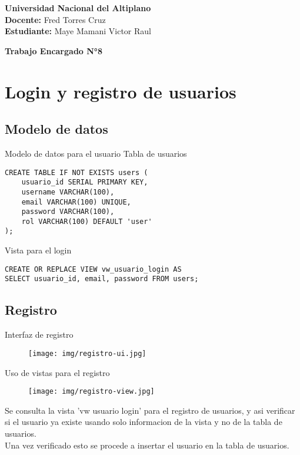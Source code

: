 \documentclass[12pt]{article}
\begin{document}
\noindent \textbf{Universidad Nacional del Altiplano\\
Docente: } Fred Torres Cruz\\
\textbf{Estudiante:} Maye Mamani Victor Raul

\vspace{2mm}
\noindent\textbf{Trabajo Encargado N°8}\\


\section{Login y registro de usuarios}
\subsection{Modelo de datos}
\large{Modelo de datos para el usuario}
\large{Tabla de usuarios}
\begin{verbatim}
CREATE TABLE IF NOT EXISTS users (
    usuario_id SERIAL PRIMARY KEY,
    username VARCHAR(100),
    email VARCHAR(100) UNIQUE,
    password VARCHAR(100),
    rol VARCHAR(100) DEFAULT 'user'
);
\end{verbatim}

\large{Vista para el login}
\begin{verbatim}
CREATE OR REPLACE VIEW vw_usuario_login AS
SELECT usuario_id, email, password FROM users;
\end{verbatim}


\subsection{Registro}
\large{Interfaz de registro}
\begin{figure}[H]
    \centering
    \texttt{[image: img/registro-ui.jpg]}
\end{figure}
\large{Uso de vistas para el registro}
\begin{figure}[H]
    \centering
    \texttt{[image: img/registro-view.jpg]}
\end{figure}
Se consulta la vista 'vw usuario login' para el registro de usuarios, y asi verificar si el usuario ya existe usando solo informacion de la vista y no de la tabla de usuarios.\\
Una vez verificado esto se procede a insertar el usuario en la tabla de usuarios.
\end{document}
